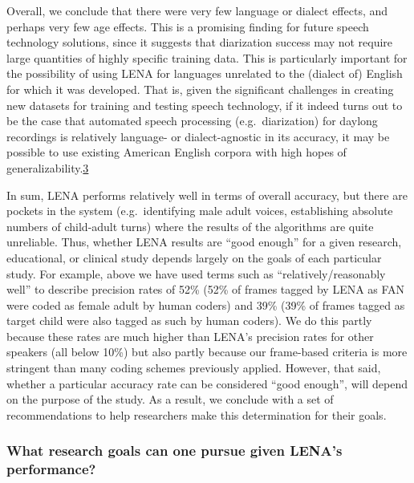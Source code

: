 \documentclass[english,floatsintext,man]{apa6}
\begin{document}
Overall, we conclude that there were very few language or dialect
effects, and perhaps very few age effects. This is a promising finding
for future speech technology solutions, since it suggests that
diarization success may not require large quantities of highly specific
training data. This is particularly important for the possibility of
using LENA for languages unrelated to the (dialect of) English for which
it was developed. That is, given the significant challenges in creating
new datasets for training and testing speech technology, if it indeed
turns out to be the case that automated speech processing
(e.g.~diarization) for daylong recordings is relatively language- or
dialect-agnostic in its accuracy, it may be possible to use existing
American English corpora with high hopes of
generalizability.\href{To\%20be\%20clear,\%20given\%20that\%20we\%20were\%20unable\%20to\%20computer\%20AWC\%20for\%20Tsimane',\%20we\%20are\%20only\%20able\%20to\%20speak\%20to\%20generalizability\%20across\%20samples\%20and\%20dialects\%20of\%20English\%20for\%20that\%20metric}{3}

In sum, LENA performs relatively well in terms of overall accuracy, but
there are pockets in the system (e.g.~identifying male adult voices,
establishing absolute numbers of child-adult turns) where the results of
the algorithms are quite unreliable. Thus, whether LENA results are
\enquote{good enough} for a given research, educational, or clinical
study depends largely on the goals of each particular study. For
example, above we have used terms such as \enquote{relatively/reasonably
well} to describe precision rates of 52\% (52\% of frames tagged by LENA
as FAN were coded as female adult by human coders) and 39\% (39\% of
frames tagged as target child were also tagged as such by human coders).
We do this partly because these rates are much higher than LENA's
precision rates for other speakers (all below 10\%) but also partly
because our frame-based criteria is more stringent than many coding
schemes previously applied. However, that said, whether a particular
accuracy rate can be considered \enquote{good enough}, will depend on
the purpose of the study. As a result, we conclude with a set of
recommendations to help researchers make this determination for their
goals.

\subsubsection{What research goals can one pursue given LENA's
performance?}\label{what-research-goals-can-one-pursue-given-lenas-performance}
\end{document}
